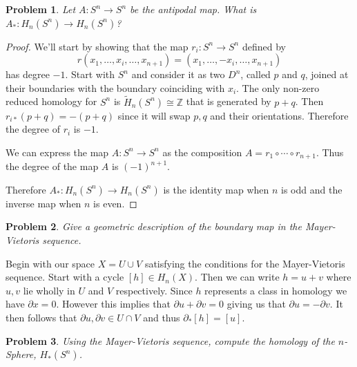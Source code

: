 \documentclass[10pt]{article}
\newcommand{\bb}[1]{\mathbb{#1}}
\newcommand{\wt}[1]{\widetilde{#1}}
\theoremstyle{plain}
\newtheorem{problem}{Problem}
\theoremstyle{remark}
\begin{document}
\begin{problem}
  Let $A: S^n \to S^n$ be the antipodal map. What is $A_\ast : H_n(S^n) \to H_n(S^n)$?
\end{problem}

\begin{proof}
  We'll start by showing that the map $r_i:S^n\rightarrow S^n$ defined by
  \[ r(x_1,\ldots,x_i,\ldots,x_{n+1})=(x_1,\ldots,-x_i,\ldots,x_{n+1})\]
  has degree $-1$. Start with $S^n$ and consider it as two $D^n$, called $p$ and $q$,
  joined at their boundaries with the boundary coinciding with $x_i$.
  The only non-zero reduced homology for $S^n$
  is $\wt{H}_n(S^n)\cong\bb{Z}$ that is generated by $p+q$. Then $r_{i*}(p+q)=-(p+q)$
  since it will swap $p,q$ and their orientations. Therefore the degree of $r_i$
  is $-1$.

  We can express the map $A:S^n\rightarrow S^n$ as the composition $A=r_1\circ\cdots\circ r_{n+1}$. Thus the
  degree of the map $A$ is $(-1)^{n+1}$.

  Therefore $A_*:H_n(S^n)\rightarrow H_n(S^n)$ is the identity map when $n$ is odd and the
  inverse map when $n$ is even.
\end{proof}

\begin{problem}
  Give a geometric description of the boundary map in the Mayer-Vietoris sequence.
\end{problem}

Begin with our space $X=U\cup V$ satisfying the conditions for the Mayer-Vietoris
sequence. Start with a cycle $[h]\in H_n(X)$. Then we can write $h=u+v$ where $u,v$
lie wholly in $U$ and $V$ respectively. Since $h$ represents a class in homology
we have $\partial x = 0$. However this implies that $\partial u+\partial v = 0$ giving us that
$\partial u = -\partial v$. It then follows that $\partial u,\partial v\in U\cap V$ and thus $\partial_*[h]=[u]$.

\begin{problem}
  Using the Mayer-Vietoris sequence, compute the homology of the $n$-Sphere, $H_\ast (S^n)$.
\end{problem}
\end{document}
